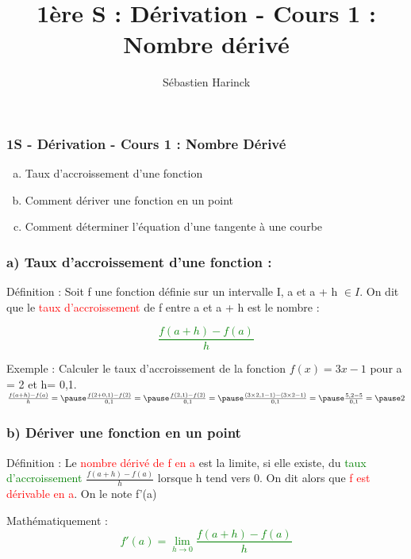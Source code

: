 \documentclass[t]{beamer}
\title{1ère S : Dérivation - Cours 1 : Nombre dérivé}
\author{Sébastien Harinck}
\institute{www.cours-futes.com}
\date{}
\begin{document}
\begin{frame}
\frametitle{1S - Dérivation - Cours 1 : Nombre Dérivé}
\begin{enumerate}[a)]
\item Taux d'accroissement d'une fonction
\item Comment dériver une fonction en un point
\item Comment déterminer l'équation d'une tangente à une courbe
\end{enumerate}
\end{frame}

\begin{frame}[label=pagebanale]
\frametitle{a)  Taux d'accroissement d'une fonction : }
\pause
\begin{block}{Définition :}
\pause
Soit f une fonction définie sur un intervalle I, \pause a et a + h $ \in I$. \pause
On dit que le \textcolor{red}{taux d'accroissement} de f \pause entre a et a + h \pause est le nombre : 
\pause
\end{block}

{\huge \textcolor{green}{\[\frac{f(a+h) - f(a)}{h}\]}}

\pause
\begin{exampleblock}{Exemple :}
\pause
Calculer le taux d'accroissement \pause
de la fonction $f(x)=3x -1$ \pause 
pour a = 2 \pause et h= 0,1. \\
\pause
\( \frac{f(a+h) - f(a)}{h} = \pause
\frac{f(2+0,1) - f(2)}{0,1} = \pause 
\frac{f(2,1) - f(2)}{0,1} = \pause
\frac{(3 \times 2,1 - 1) - (3 \times 2 - 1)}{0,1} = \pause
\frac{ 5,2 - 5}{0,1} = \pause
2
\)
\end{exampleblock}
\end{frame}

\begin{frame}[label=pagebanale]
\frametitle{b) Dériver une fonction en un point}
\pause
\begin{block}{Définition :}
\pause
Le \textcolor{red}{nombre dérivé de f en a} est la limite, \pause si elle existe, \pause du \textcolor{green}{taux d'accroissement} \pause
\(\frac{f(a+h) - f(a)}{h}\)
\pause
lorsque h tend vers 0. \pause 
On dit alors que \textcolor{red}{f est dérivable en a}. \pause On le note f'(a)
\pause
\end{block}
\begin{block}{Mathématiquement :}
\pause
{\Huge \textcolor{green}{\[ f'(a) = \lim\limits_{h \rightarrow 0}\frac{f(a+h) - f(a)}{h}\]}}
\end{block}
\end{frame}
\end{document}
